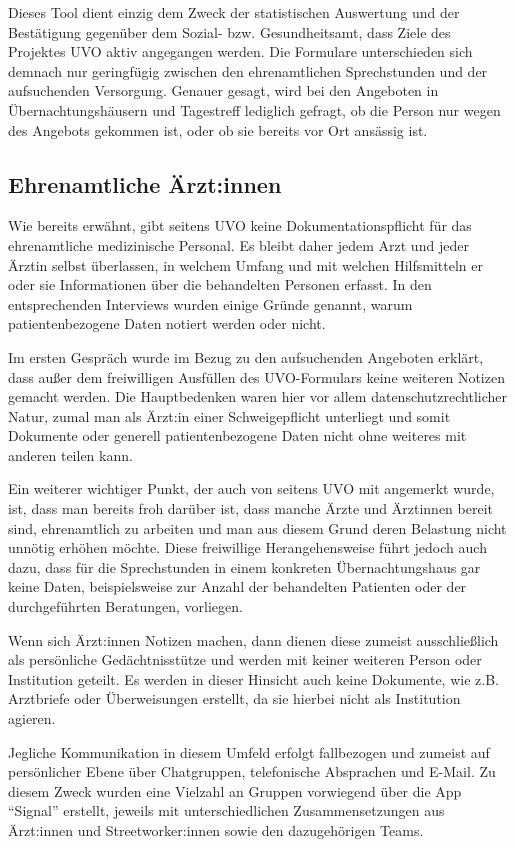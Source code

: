 Dieses Tool dient einzig dem Zweck der statistischen Auswertung und der Bestätigung gegenüber dem Sozial- bzw. Gesundheitsamt, dass Ziele des Projektes \acs{UVO} aktiv angegangen werden. Die Formulare unterschieden sich demnach nur geringfügig zwischen den ehrenamtlichen Sprechstunden und der aufsuchenden Versorgung. Genauer gesagt, wird bei den Angeboten in Übernachtungshäusern und Tagestreff lediglich gefragt, ob die Person nur wegen des Angebots gekommen ist, oder ob sie bereits vor Ort ansässig ist.

\subsection{Ehrenamtliche Ärzt:innen}

Wie bereits erwähnt, gibt seitens \acs{UVO} keine Dokumentationspflicht für das ehrenamtliche medizinische Personal. Es bleibt daher jedem Arzt und jeder Ärztin selbst überlassen, in welchem Umfang und mit welchen Hilfsmitteln er oder sie Informationen über die behandelten Personen erfasst. In den entsprechenden Interviews wurden einige Gründe genannt, warum patientenbezogene Daten notiert werden oder nicht.

Im ersten Gespräch wurde im Bezug zu den aufsuchenden Angeboten erklärt, dass außer dem freiwilligen Ausfüllen des UVO-Formulars keine weiteren Notizen gemacht werden. Die Hauptbedenken waren hier vor allem datenschutzrechtlicher Natur, zumal man als Ärzt:in einer Schweigepflicht unterliegt und somit Dokumente oder generell patientenbezogene Daten nicht ohne weiteres mit anderen teilen kann.

Ein weiterer wichtiger Punkt, der auch von seitens \acs{UVO} mit angemerkt wurde, ist, dass man bereits froh darüber ist, dass manche Ärzte und Ärztinnen bereit sind, ehrenamtlich zu arbeiten und man aus diesem Grund deren Belastung nicht unnötig erhöhen möchte. Diese freiwillige Herangehensweise führt jedoch auch dazu, dass für die Sprechstunden in einem konkreten Übernachtungshaus gar keine Daten, beispielsweise zur Anzahl der behandelten Patienten oder der durchgeführten Beratungen, vorliegen.

Wenn sich Ärzt:innen Notizen machen, dann dienen diese zumeist ausschließlich als persönliche Gedächtnisstütze und werden mit keiner weiteren Person oder Institution geteilt. Es werden in dieser Hinsicht auch keine Dokumente, wie z.B. Arztbriefe oder Überweisungen erstellt, da sie hierbei nicht als Institution agieren.

Jegliche Kommunikation in diesem Umfeld erfolgt fallbezogen und zumeist auf persönlicher Ebene über Chatgruppen, telefonische Absprachen und E-Mail. Zu diesem Zweck wurden eine Vielzahl an Gruppen vorwiegend über die App \enquote{Signal} erstellt, jeweils mit unterschiedlichen Zusammensetzungen aus Ärzt:innen und Streetworker:innen sowie den dazugehörigen Teams.

